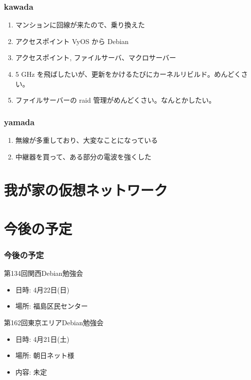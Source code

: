 \documentclass[cjk,dvipdfmx,10pt,compress,%
hyperref={bookmarks=true,bookmarksnumbered=true,bookmarksopen=false,%
colorlinks=false,%
pdftitle={第 132 回 関西 Debian 勉強会},%
pdfauthor={かわだ},%
pdfsubject={資料},%
}]{beamer}
\begin{document}
\begin{frame}
  \frametitle{kawada}
  \begin{enumerate}
  \item マンションに回線が来たので、乗り換えた
  \item アクセスポイント VyOS から Debian
  \item アクセスポイント, ファイルサーバ、マクロサーバー
  \item 5 GHz を飛ばしたいが、更新をかけるたびにカーネルリビルド。めんどくさい。
  \item ファイルサーバーの raid 管理がめんどくさい。なんとかしたい。
  \end{enumerate}
\end{frame}

\begin{frame}
  \frametitle{yamada}
  \begin{enumerate}
  \item 無線が多重しており、大変なことになっている
  \item 中継器を買って、ある部分の電波を強くした
  \end{enumerate}
\end{frame}


\section{我が家の仮想ネットワーク}


\section{今後の予定}
\begin{frame}[fragile]
  \frametitle{今後の予定}

  \begin{block}{第134回関西Debian勉強会}
    \begin{itemize}
    \item 日時: 4月22日(日)
    \item 場所: 福島区民センター
    \end{itemize}
  \end{block}

  \begin{block}{第162回東京エリアDebian勉強会}
    \begin{itemize}
    \item 日時: 4月21日(土)
    \item 場所: 朝日ネット様
    \item 内容: 未定 
    \end{itemize}
  \end{block}

\end{frame}

\takahashi[50]{  }
\end{document}
